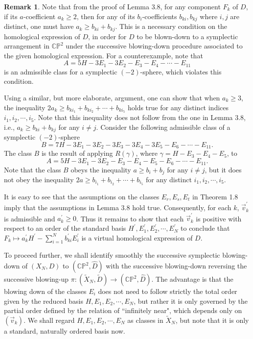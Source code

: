 \documentclass[11pt]{amsart}
\theoremstyle{plain}
\numberwithin{theorem}{section}
\theoremstyle{definition}
\newtheorem{remark}[theorem]{Remark}
\newcommand{\C}{{\mathbb C}}
\renewcommand{\P}{{\mathbb P}}
\begin{document}
\begin{remark}
Note that from the proof of Lemma 3.8, for any component $F_k$ of $D$, if its $a$-coefficient $a_k\geq 2$, then for any of its $b_i$-coefficients $b_{ki}, b_{kj}$ where $i,j$ are distinct, one must have
$a_k\geq b_{ki}+b_{kj}$. This is a necessary condition on the homological expression of  $D$, in order for $D$ to be blown-down to a symplectic arrangement in $\C\P^2$ under the successive blowing-down procedure associated to the given homological expression. For a counterexample, note that 
$$
A=5H-3E_1-3E_2-E_3-E_4-\cdots-E_{11}
$$
is an admissible class for a symplectic $(-2)$-sphere, which violates this condition. 

Using a similar, but more elaborate, argument, one can show that when $a_k\geq 3$, the inequality 
$2a_k\geq b_{ki_1}+b_{ki_2}+\cdots +b_{ki_5}$ holds true for any distinct indices $i_1,i_2,\cdots,i_5$.
Note that this inequality does not follow from the one in Lemma 3.8, i.e., $a_k\geq b_{ki}+b_{kj}$ for any 
$i\neq j$. Consider the following admissible class of a symplectic $(-2)$-sphere
$$
B=7H-3E_1-3E_2-3E_3-3E_4-3E_5-E_6-\cdots-E_{11}.
$$
The class $B$ is the result of applying $R(\gamma)$, where $\gamma=H-E_3-E_4-E_5$, to
$$
A=5H-3E_1-3E_2-E_3-E_4-E_5-E_6-\cdots-E_{11}.
$$
Note that the class $B$ obeys the inequality $a\geq b_{i}+b_{j}$ for any $i\neq j$, but it does not obey the inequality 
$2a\geq b_{i_1}+b_{i_2}+\cdots +b_{i_5}$ for any distinct $i_1,i_2,\cdots,i_5$.
\end{remark}

\vspace{2mm}


\vspace{2mm}

It is easy to see that the assumptions on the classes $E_r,E_s,E_t$ in Theorem 1.8 imply that the assumptions in Lemma 3.8 hold true. Consequently, for each $k$, $\vec{v}_k^\prime$ is admissible and $a_k^\prime\geq 0$. Thus it remains to show that each $\vec{v}_k^\prime$ is positive with respect to an order of the standard basis 
$H^\prime, E_1^\prime, E_2^\prime,\cdots, E_N^\prime$ to conclude that $F_k\mapsto a_k^\prime H^\prime-\sum_{i=1}^N b_{ki}^\prime E_i^\prime$ is a virtual homological expression of $D$. 

To proceed further, we shall identify smoothly the successive symplectic blowing-down of $(X_N,D)$ to 
$(\C\P^2,\hat{D})$ with the successive blowing-down reversing the successive blowing-up 
$\pi: (\tilde{X}_N,\tilde{D})\rightarrow (\C\P^2,\hat{D})$. The advantage is that the blowing down of the classes $E_i$ does not need to follow strictly the total order given by the reduced basis $H,E_1,E_2,\cdots,E_N$, but rather it is only governed by the partial order defined by the relation of ``infinitely near", which depends only on $(\vec{v}_k)$. We shall regard $H,E_1,E_2,\cdots,E_N$ as classes in $\tilde{X}_N$, but note that it is only a standard, naturally ordered basis now. 
\end{document}

